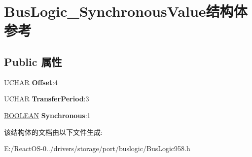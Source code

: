 \hypertarget{struct_bus_logic___synchronous_value}{}\section{Bus\+Logic\+\_\+\+Synchronous\+Value结构体 参考}
\label{struct_bus_logic___synchronous_value}
\subsection*{Public 属性}
\begin{DoxyCompactItemize}
\item 
\mbox{\label{struct_bus_logic___synchronous_value_a40e24d1079300634dcd44bdc4231a42a}} 
U\+C\+H\+AR {\bfseries Offset}\+:4
\item 
\mbox{\label{struct_bus_logic___synchronous_value_a1675d71a4f7d4a9251c9fea0b4511030}} 
U\+C\+H\+AR {\bfseries Transfer\+Period}\+:3
\item 
\mbox{\label{struct_bus_logic___synchronous_value_ac32c49e22e299198c66496fa690408d8}} 
\hyperlink{_processor_bind_8h_a112e3146cb38b6ee95e64d85842e380a}{B\+O\+O\+L\+E\+AN} {\bfseries Synchronous}\+:1
\end{DoxyCompactItemize}


该结构体的文档由以下文件生成\+:\begin{DoxyCompactItemize}
\item 
E\+:/\+React\+O\+S-\/0../drivers/storage/port/buslogic/Bus\+Logic958.\+h\end{DoxyCompactItemize}
